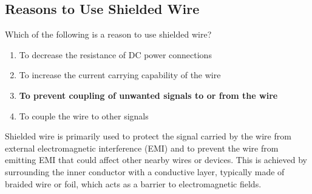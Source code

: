 \subsection{Reasons to Use Shielded Wire}
\label{T6D03}

\begin{tcolorbox}[colback=gray!10!white,colframe=black!75!black,title=T6D03]
Which of the following is a reason to use shielded wire?
\begin{enumerate}[noitemsep]
    \item To decrease the resistance of DC power connections
    \item To increase the current carrying capability of the wire
    \item \textbf{To prevent coupling of unwanted signals to or from the wire}
    \item To couple the wire to other signals
\end{enumerate}
\end{tcolorbox}

Shielded wire is primarily used to protect the signal carried by the wire from external electromagnetic interference (EMI) and to prevent the wire from emitting EMI that could affect other nearby wires or devices. This is achieved by surrounding the inner conductor with a conductive layer, typically made of braided wire or foil, which acts as a barrier to electromagnetic fields.